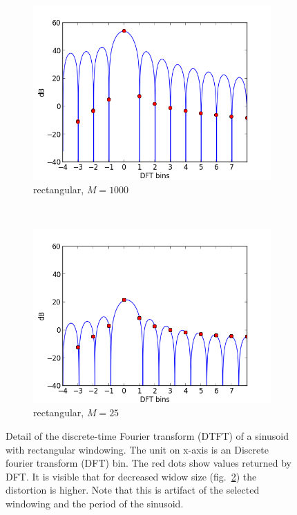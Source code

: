 \begin{figure}[h!]%
  \centering
        \begin{subfigure}[b]{0.5\textwidth}
                \centering
                \includegraphics[width=\textwidth]{img/leakage_rect_1000}
                \caption{\small rectangular, $M=1000$}
                \label{fig:leakage_rect_1000}
        \end{subfigure}%
        ~ \begin{subfigure}[b]{0.5\textwidth}
                \centering
                \includegraphics[width=\textwidth]{img/leakage_rect_25}
                \caption{\small rectangular, $M=25$}
                \label{fig:leakage_rect_25}
        \end{subfigure}%
  \caption{\small Detail of the discrete-time Fourier transform (DTFT) of a sinusoid 
  with rectangular  windowing.
  The unit on x-axis is an Discrete fourier transform (DFT) bin.
  The red dots show values returned by DFT. It is visible that for decreased widow
   size (fig.~\ref{fig:leakage_rect_25}) the distortion is higher. Note that this is 
   artifact of the selected windowing and the period of the sinusoid.}
  \label{fig:leakage_rect}
\end{figure}

